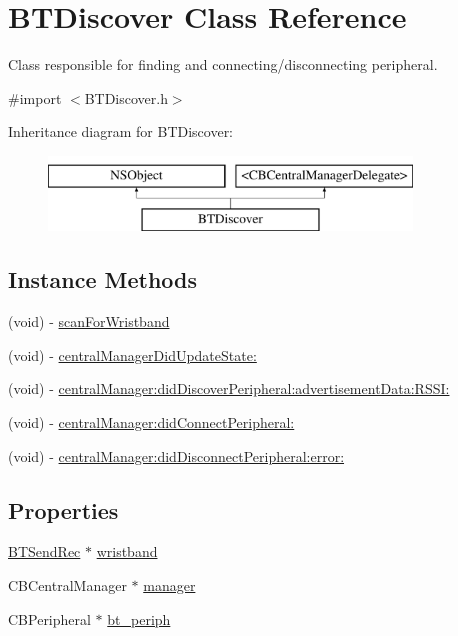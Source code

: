 \hypertarget{interfaceBTDiscover}{\section{B\-T\-Discover Class Reference}
\label{interfaceBTDiscover}
}


Class responsible for finding and connecting/disconnecting peripheral.  




{\ttfamily \#import $<$B\-T\-Discover.\-h$>$}

Inheritance diagram for B\-T\-Discover\-:\begin{figure}[H]
\begin{center}
\leavevmode
\includegraphics[height=2.000000cm]{interfaceBTDiscover}
\end{center}
\end{figure}
\subsection*{Instance Methods}
\begin{DoxyCompactItemize}
\item 
(void) -\/ \hyperlink{interfaceBTDiscover_a8f79744b7fda346637a523075043b501}{scan\-For\-Wristband}
\item 
(void) -\/ \hyperlink{interfaceBTDiscover_aee431dcb8f6de0bbaa3b812e8e48cdbc}{central\-Manager\-Did\-Update\-State\-:}
\item 
(void) -\/ \hyperlink{interfaceBTDiscover_af8e43de53c115f15bff0eeccbcdf260a}{central\-Manager\-:did\-Discover\-Peripheral\-:advertisement\-Data\-:\-R\-S\-S\-I\-:}
\item 
(void) -\/ \hyperlink{interfaceBTDiscover_a892d491ba386390b6f774c141e278054}{central\-Manager\-:did\-Connect\-Peripheral\-:}
\item 
(void) -\/ \hyperlink{interfaceBTDiscover_a97b8fd0dd542e6b41378922977ecbb0d}{central\-Manager\-:did\-Disconnect\-Peripheral\-:error\-:}
\end{DoxyCompactItemize}
\subsection*{Properties}
\begin{DoxyCompactItemize}
\item 
\hyperlink{interfaceBTSendRec}{B\-T\-Send\-Rec} $\ast$ \hyperlink{interfaceBTDiscover_ac6fc7e50655c8ad721cb1e3a167767b6}{wristband}
\item 
C\-B\-Central\-Manager $\ast$ \hyperlink{interfaceBTDiscover_a7e656419213fe4da7163a7fc82fcc2a9}{manager}
\item 
C\-B\-Peripheral $\ast$ \hyperlink{interfaceBTDiscover_a611f96cb207ccfc4bc06e33f54183374}{bt\-\_\-periph}
\end{DoxyCompactItemize}


